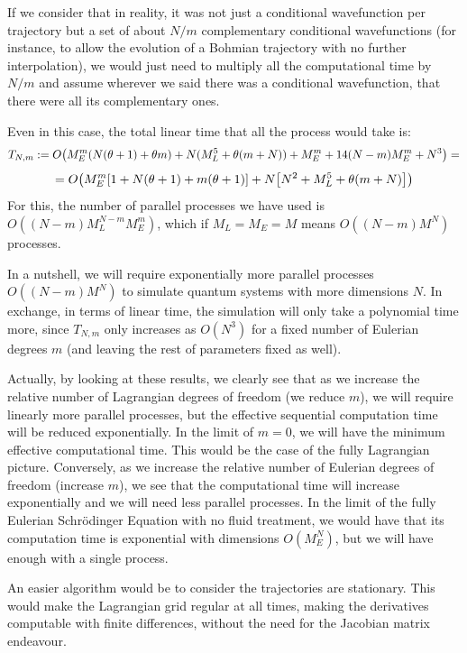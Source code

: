 \documentclass[11pt, a4paper]{article} %
\begin{document}
If we consider that in reality, it was not just a conditional wavefunction per trajectory but a set of about $N/m$ complementary conditional wavefunctions (for instance, to allow the evolution of a Bohmian trajectory with no further interpolation), we would just need to multiply all the computational time by $N/m$ and assume wherever we said there was a conditional wavefunction, that there were all its complementary ones.

Even in this case, the total linear time that all the process would take is:
\begin{equation}
T_{N,m}:=O\qty(M_E^m(N(\theta+1)+\theta m)+N(M_L^5+\theta(m+N))+M_E^m+14(N-m)M_E^m+N^3)=
\end{equation}
$$
=O\qty(M_E^m\qty[1+N(\theta+1)+m(\theta+1)]+N\qty[N^2+M_L^5+\theta(m+N) ])
$$
For this, the number of parallel processes we have used is $O((N-m)M_L^{N-m}M_E^{m})$, which if $M_L=M_E=M$ means $O((N-m)M^{N})$ processes.

In a nutshell, we will require exponentially more parallel processes $O((N-m)M^{N})$ to simulate quantum systems with more dimensions $N$. In exchange, in terms of linear time, the simulation will only take a polynomial time more, since $T_{N,m}$ only increases as $O(N^3)$ for a fixed number of Eulerian degrees $m$ (and leaving the rest of parameters fixed as well).

Actually, by looking at these results, we clearly see that as we increase the relative number of Lagrangian degrees of freedom (we reduce $m$), we will require linearly more parallel processes, but the effective sequential computation time will be reduced exponentially. In the limit of $m=0$, we will have the minimum effective computational time. This would be the case of the fully Lagrangian picture. Conversely, as we increase the relative number of Eulerian degrees of freedom (increase $m$), we see that the computational time will increase exponentially and we will need less parallel processes. In the limit of the fully Eulerian Schrödinger Equation with no fluid treatment, we would have that its computation time is exponential with dimensions $O(M_E^N)$, but we will have enough with a single process.

An easier algorithm would be to consider the trajectories are stationary. This would make the Lagrangian grid regular at all times, making the derivatives computable with finite differences, without the need for the Jacobian matrix endeavour.
\end{document}
